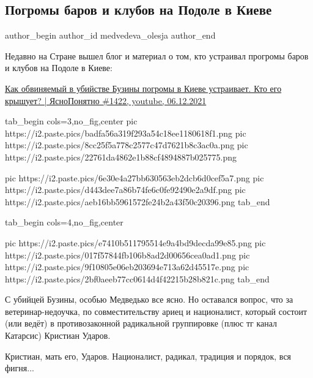  
 
 
 
 
\subsection{Погромы баров и клубов на Подоле в Киеве}
\label{sec:09_12_2021.tg.medvedeva_olesja.2.pogrom_bar_podol_kiev}


\ifcmt
 author_begin
   author_id medvedeva_olesja
 author_end
\fi

Недавно на Стране вышел блог и материал о том, кто устраивал прогромы баров и
клубов на Подоле в Киеве: 

\href{https://youtu.be/BKmx3tdXdJU}{%
Как обвиняемый в убийстве Бузины погромы в Киеве устраивает. Кто его крышует? | ЯсноПонятно \#1422, %
youtube, 06.12.2021%
}

\ifcmt
  tab_begin cols=3,no_fig,center
     pic https://i2.paste.pics/badfa56a319f293a54c18ee1180618f1.png
		 pic https://i2.paste.pics/8cc25f5a778c2577c47d7621b8c3ac0a.png
		 pic https://i2.paste.pics/22761da4862e1b88cf4894887b025775.png

		 pic https://i2.paste.pics/6e30e4a27bb630563eb2dcb6d0cef5a7.png
		 pic https://i2.paste.pics/d443dee7a86b74fe6c0fe92490e2a9df.png
		 pic https://i2.paste.pics/aeb16bb5961572fe24b2a43f50c20396.png
  tab_end
\fi

\ifcmt
  tab_begin cols=4,no_fig,center

		 pic https://i2.paste.pics/e7410b511795514e9a4bd9decda99e85.png
		 pic https://i2.paste.pics/017f57844fb106b8ad2d00656cea0ad1.png
		 pic https://i2.paste.pics/9f10805e06eb203694e713a62d45517e.png
		 pic https://i2.paste.pics/2bf0aeeb77cc0614d4f42215b28b821c.png
  tab_end
\fi

С убийцей Бузины, особью Медведько все ясно. Но оставался вопрос, что за
ветеринар-недоучка, по совместительству ариец и националист, который состоит
(или ведёт) в противозаконной радикальной группировке (плюс тг канал Катарсис)
Кристиан Ударов. 

Кристиан, мать его, Ударов. Националист, радикал, традиция и порядок, вся
фигня...

